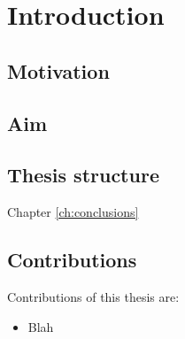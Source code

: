 \chapter{Introduction}
\label{ch:intro}


\section{Motivation}



\section{Aim}



\section{Thesis structure}


\begin{description}
\item[Chapter \ref{ch:conclusions}]
\end{description}


\section{Contributions}
Contributions of this thesis are:
\begin{itemize}
\item Blah %
\end{itemize}
